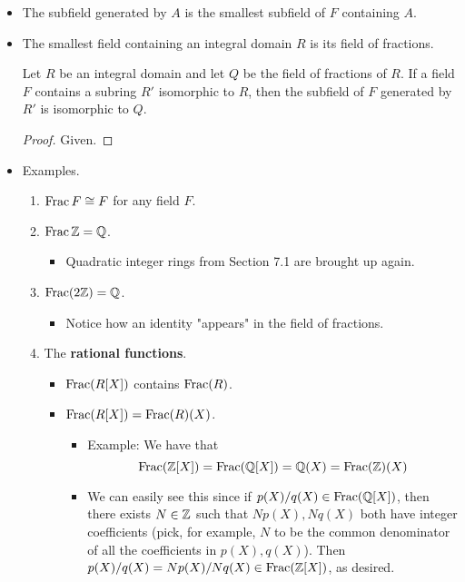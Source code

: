 \documentclass[../notes.tex]{subfiles}
\begin{document}
\begin{itemize}
    \item The subfield generated by $A$ is the smallest subfield of $F$ containing $A$.
    \item The smallest field containing an integral domain $R$ is its field of fractions.
    \begin{corollary}\label{cly:7.16}
        Let $R$ be an integral domain and let $Q$ be the field of fractions of $R$. If a field $F$ contains a subring $R'$ isomorphic to $R$, then the subfield of $F$ generated by $R'$ is isomorphic to $Q$.
        \begin{proof}
            Given.
        \end{proof}
    \end{corollary}
    \item Examples.
    \begin{enumerate}
        \item $\operatorname{Frac} F\cong F$ for any field $F$.
        \item $\operatorname{Frac}\mathbb{Z}=\mathbb{Q}$.
        \begin{itemize}
            \item Quadratic integer rings from Section 7.1 are brought up again.
        \end{itemize}
        \item $\operatorname{Frac}(2\mathbb{Z})=\mathbb{Q}$.
        \begin{itemize}
            \item Notice how an identity "appears" in the field of fractions.
        \end{itemize}
        \item The \textbf{rational functions}.
        \begin{itemize}
            \item $\operatorname{Frac}(R[X])$ contains $\operatorname{Frac}(R)$.
            \item $\operatorname{Frac}(R[X])=\operatorname{Frac}(R)(X)$.
            \begin{itemize}
                \item Example: We have that
                \begin{equation*}
                    \operatorname{Frac}(\mathbb{Z}[X]) = \operatorname{Frac}(\mathbb{Q}[X])
                    = \mathbb{Q}(X)
                    = \operatorname{Frac}(\mathbb{Z})(X)
                \end{equation*}
                \item We can easily see this since if $p(X)/q(X)\in\operatorname{Frac}(\mathbb{Q}[X])$, then there exists $N\in\mathbb{Z}$ such that $Np(X),Nq(X)$ both have integer coefficients (pick, for example, $N$ to be the common denominator of all the coefficients in $p(X),q(X)$). Then $p(X)/q(X)=Np(X)/Nq(X)\in\operatorname{Frac}(\mathbb{Z}[X])$, as desired.

\end{itemize}
\end{itemize}
\end{enumerate}
\end{itemize}
\end{document}
